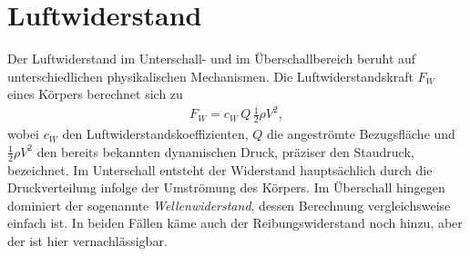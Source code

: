 %
%
%
%
\section{Luftwiderstand\label{ueberschall:section:Luftwiderstand}}
Der Luftwiderstand im Unterschall- und im Überschallbereich 
beruht auf unterschiedlichen physikalischen Mechanismen.
%
Die Luftwiderstandskraft $F_W$~\cite{StroemwiderWikiDE} eines Körpers 
berechnet sich zu
\begin{align*}
    F_W
    = c_W \, Q \, \frac{1}{2} \rho V^2,
\end{align*}
wobei $c_W$ den Luftwiderstandskoeffizienten, $Q$ die angeströmte 
Bezugsfläche und $\tfrac{1}{2}\rho V^2$ den bereits bekannten dynamischen Druck, 
präziser den Staudruck, bezeichnet.
Im Unterschall entsteht der Widerstand hauptsächlich durch die Druckverteilung 
infolge der Umströmung des Körpers. 
Im Überschall hingegen dominiert der sogenannte \emph{Wellenwiderstand}, 
%
dessen Berechnung vergleichsweise einfach ist.
In beiden Fällen käme auch der Reibungswiderstand noch hinzu,
aber der ist hier vernachlässigbar.

